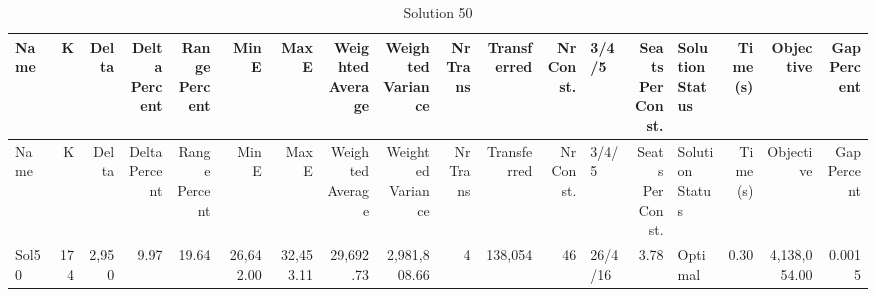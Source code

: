 \documentclass[a4paper]{article}
\begin{document}
{\scriptsize
\begin{longtable}{lrrrrrrrrrrrlrlrrr}
\caption{Solution 50}
\\ \toprule
Name &K &Delta &\shortstack{Delta\\Percent} &\shortstack{Range\\Percent} &Min E &Max E &\shortstack{Weighted\\Average} &\shortstack{Weighted\\Variance} &\shortstack{Nr\\Trans} &Transferred &\shortstack{Nr\\Const.} &3/4/5 &\shortstack{Seats\\Per\\Const.} &\shortstack{Solution\\Status} &\shortstack{Time\\(s)} &Objective &\shortstack{Gap\\Percent} \\ \midrule
\endfirsthead
\toprule
Name &K &Delta &\shortstack{Delta\\Percent} &\shortstack{Range\\Percent} &Min E &Max E &\shortstack{Weighted\\Average} &\shortstack{Weighted\\Variance} &\shortstack{Nr\\Trans} &Transferred &\shortstack{Nr\\Const.} &3/4/5 &\shortstack{Seats\\Per\\Const.} &\shortstack{Solution\\Status} &\shortstack{Time\\(s)} &Objective &\shortstack{Gap\\Percent} \\ \midrule
\endhead
\bottomrule
\endfoot
Sol50&174&2,950& 9.97&19.64&26,642.00&32,453.11&29,692.73&2,981,808.66&4&138,054&46&26/4/16& 3.78&Optimal& 0.30&4,138,054.00&0.0015\\ 
\end{longtable}

}
\end{document}

